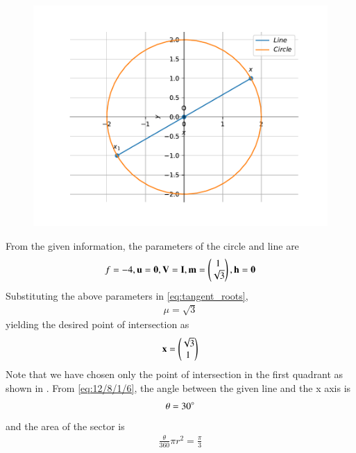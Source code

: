 	\begin{figure}[!h]
		\centering
 \includegraphics[width=\columnwidth]{chapters/12/8/1/6/figs/conics-fig.pdf} 
		\caption{}
		\label{fig:12/8/1/6}
  	\end{figure}
  From the given information, the parameters of the  circle and line are
                      \begin{align}
			      f= -4, \mathbf{u}=\mathbf{0}, \mathbf{V}=\mathbf{I}, \mathbf{m}=\begin{pmatrix}1 \\ \sqrt{3}\end{pmatrix}, \mathbf{h} = \mathbf{0}
		\label{eq:12/8/1/6}
                    \end{align}                                                                              
Substituting		    the above parameters in  
\eqref{eq:tangent_roots},
	  \begin{align}                                                                               
		  \mu= \sqrt{3}
	  \end{align}
	  yielding  
the desired point of intersection as                                               
\begin{align}
	\mathbf{x} = \begin{pmatrix}\sqrt{3} \\ 1\end{pmatrix}                               
\end{align}
Note that we have chosen only the point of intersection in the first quadrant as shown in 
		.
From
		\eqref{eq:12/8/1/6},
		the angle between the given line and the x axis is
\begin{align}
	\theta=30\degree
\end{align} 
and
the area of the sector is 
\begin{align}
	{\frac{\theta}{360}}\pi r^2=
	\frac{\pi}{3}
\end{align}
